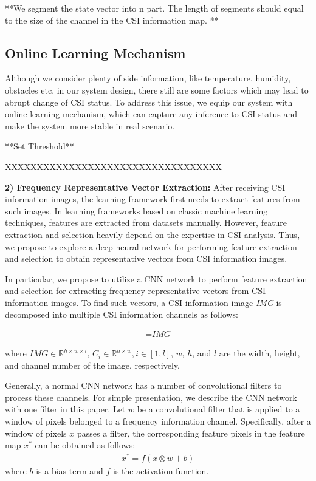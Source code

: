 \documentclass[10pt,conference,letterpaper]{IEEEtran}
\begin{document}
**We segment the state vector into n part. The length of segments should equal to the size of the channel in the CSI information map. **

\subsection{Online Learning Mechanism}
Although we consider plenty of side information, like temperature, humidity, obstacles etc. in our system design, there still are some factors which may lead to abrupt change of CSI status. To address this issue, we equip our system with online learning mechanism, which can capture any inference to CSI status and make the system more stable in real scenario.

**Set Threshold**

XXXXXXXXXXXXXXXXXXXXXXXXXXXXXXXXXX

\textbf{2) Frequency Representative Vector Extraction: }After receiving CSI information images, the learning framework first needs to extract features from such images. In learning frameworks based on classic machine learning techniques, features are extracted from datasets manually. However, feature extraction and selection heavily depend on the expertise in CSI analysis. Thus, we propose to explore a deep neural network for performing feature extraction and selection to obtain representative vectors from CSI information images.

In particular, we propose to utilize a CNN network to perform feature extraction and selection for extracting frequency representative vectors from CSI information images. To find such vectors, a CSI information image \textit{IMG} is decomposed into multiple CSI information channels as follows:

\begin{eqnarray}
 [C_1, C_2, \cdots, C_l] = \textit{IMG} 
\end{eqnarray}

where $\textit{IMG}\in \mathbb{R}^{h\times w\times l}$, $C_i\in\mathbb{R}^{h\times w}, i\in[1,l]$, $w$, $h$, and $l$ are the width, height, and channel number of the image, respectively.

Generally, a normal CNN network has a number of convolutional filters to process these channels. For simple presentation, we describe the CNN network with one filter in this paper. Let $w$ be a convolutional filter that is applied to a window of pixels belonged to a frequency information channel. Specifically, after a window of pixels $x$ passes a filter, the corresponding feature pixels in the feature map $x^\ast$ can be obtained as follows:
\begin{eqnarray}
{x^*} = f\left( {x \otimes w + b} \right)
\end{eqnarray}
where $b$ is a bias term and $f$ is the activation function. 
\end{document}
